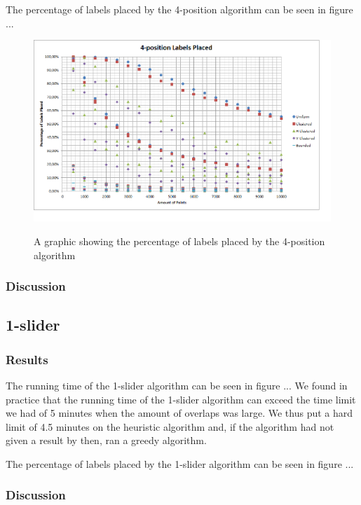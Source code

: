 \documentclass[crop=false,a4paper,oneside,11pt]{standalone}
\begin{document}
The percentage of labels placed by the 4-position algorithm can be seen in figure ...
 \begin{figure}[h!]
 \centering
  \includegraphics[scale = 0.5]{4PosLabelsPlaced.png}\\
  \caption{A graphic showing the percentage of labels placed by the 4-position algorithm}
 \end{figure}
\subsubsection{Discussion}

\subsection{1-slider}
\subsubsection{Results}
The running time of the 1-slider algorithm can be seen in figure ... We found in practice that the running time of the 1-slider algorithm can exceed the time limit we had of 5 minutes when the amount of overlaps was large. We thus put a hard limit of 4.5 minutes on the heuristic algorithm and, if the algorithm had not given a result by then, ran a greedy algorithm.

The percentage of labels placed by the 1-slider algorithm can be seen in figure ...
\subsubsection{Discussion}
\end{document}
